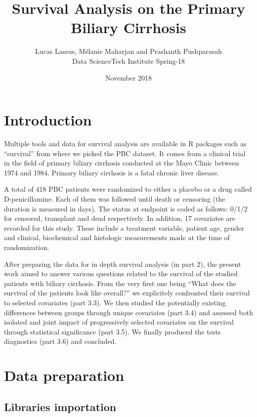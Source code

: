 \documentclass[]{article}
\title{Survival Analysis on the Primary Biliary Cirrhosis}
\author{Lucas Lassus, Mélanie Maharjan and Prashanth Pushparasah \\ Data ScienceTech Institute Spring-18}
\date{November 2018}
\begin{document}
\maketitle

{
\setcounter{tocdepth}{2}
\tableofcontents
}
\section{Introduction}\label{introduction}

Multiple tools and data for survival analysis are available in R
packages such as ``survival'' from where we picked the PBC dataset. It
comes from a clinical trial in the field of primary biliary cirrhosis
conducted at the Mayo Clinic between 1974 and 1984. Primary biliary
cirrhosis is a fatal chronic liver disease.

A total of 418 PBC patients were randomized to either a placebo or a
drug called D-penicillamine. Each of them was followed until death or
censoring (the duration is measured in days). The status at endpoint is
coded as follows: 0/1/2 for censored, transplant and dead respectively.
In addition, 17 covariates are recorded for this study. These include a
treatment variable, patient age, gender and clinical, biochemical and
histologic measurements made at the time of randomization.

After preparing the data for in depth survival analysis (in part 2), the
present work aimed to answer various questions related to the survival
of the studied patients with biliary cirrhosis. From the very first one
being ``What does the survival of the patients look like overall?'' we
explicitely confronted their survival to selected covariates (part 3.3).
We then studied the potentially existing differences between groups
through unique covariates (part 3.4) and assessed both isolated and
joint impact of progressively selected covariates on the survival
through statistical significance (part 3.5). We finally produced the
tests diagnostics (part 3.6) and concluded.

\section{Data preparation}\label{data-preparation}

\subsection{Libraries importation}\label{libraries-importation}
\end{document}
